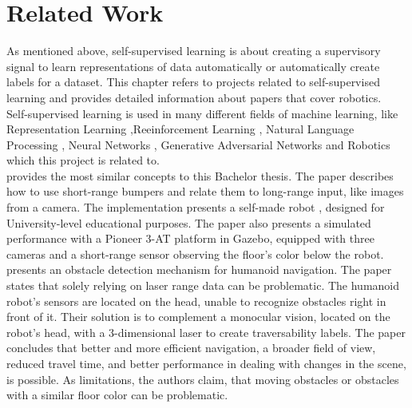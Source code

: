 \section{Related Work \label{RelatedWork} }
As mentioned above, self-supervised learning is about creating a supervisory signal to learn representations of data automatically or automatically create labels for a dataset. This chapter refers to projects related to self-supervised learning and provides detailed information about papers that cover robotics.\\

Self-supervised learning is used in many different fields of machine learning, like Representation Learning \cite{lee2020predicting,wang2020selfsupervised},Reeinforcement Learning \cite{xin2020selfsupervised}, Natural Language Processing \cite{meng2019selfsupervised}, Neural Networks \cite{wang2020selfsupervised,kundu2020appearance,harley2020tracking,luo2020exploring}, Generative Adversarial Networks \cite{mahapatra2020structure} and Robotics \cite{vibrationBasedLearning,nava2019learning,5979661,roboOverhead,Dahlkamp-RSS-06,932633,godard2018digging,hecke2016persistent,g2017learning} which this project is related to. \\

\cite{nava2019learning} provides the most similar concepts to this Bachelor thesis. The paper describes how to use short-range bumpers and relate them to long-range input, like images from a camera. The implementation presents a self-made robot \cite{mightyThymio}, designed for University-level educational purposes. The paper also presents a simulated performance with a Pioneer 3-AT platform in Gazebo, equipped with three cameras and a short-range sensor observing the floor's color below the robot.\\

\cite{5979661} presents an obstacle detection mechanism for humanoid navigation. The paper states that solely relying on laser range data can be problematic. The humanoid robot's sensors are located on the head, unable to recognize obstacles right in front of it. Their solution is to complement a monocular vision, located on the robot's head, with a 3-dimensional laser to create traversability labels. The paper concludes that better and more efficient navigation, a broader field of view, reduced travel time, and better performance in dealing with changes in the scene, is possible. As limitations, the authors claim, that moving obstacles or obstacles with a similar floor color can be problematic.\\

